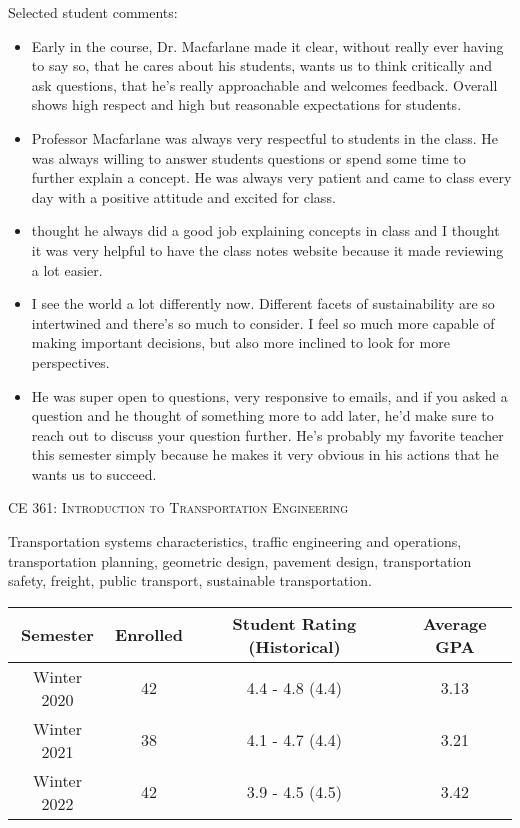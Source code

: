 \documentclass[margin,line]{res}
\newif\ifdetail
\newcommand{\acc}{\scshape }
\begin{document}
\begin{resume}
Selected student comments:
\begin{itemize}
  \item Early in the course, Dr. Macfarlane made it clear, without really ever
    having to say so, that he cares about his students, wants us to think
    critically and ask questions, that he's really approachable and welcomes
    feedback. Overall shows high respect and high but reasonable expectations
    for students.
  \item Professor Macfarlane was always very respectful to students in the class. He
    was always willing to answer students questions or spend some time to
    further explain a concept. He was always very patient and came to class
    every day with a positive attitude and excited for class.
  \item thought he always did a good job explaining concepts in class and I thought it was very helpful to have the class notes website because it made reviewing a lot easier.
  \item I see the world a lot differently now. Different facets of sustainability are so intertwined and there's so much to consider. I feel so much more capable of making important decisions, but also more inclined to look for more perspectives.
  \item He was super open to questions, very responsive to emails, and if you asked a question and he thought of something more to add later, he'd make sure to reach out to discuss your question further. He's probably my favorite teacher this semester simply because he makes it very obvious in his actions that he wants us to succeed.
\end{itemize}


\fi

\vspace{.4cm}
{\acc CE 361: Introduction to Transportation Engineering}

\vspace{-.4cm}
Transportation systems characteristics, traffic engineering and operations,
transportation planning, geometric design, pavement design, transportation
safety, freight, public transport, sustainable transportation.

\ifdetail
\begin{tabular}{cccc}
  \toprule
  Semester & Enrolled & Student Rating (Historical) & Average GPA\\
  \midrule
  Winter 2020 & 42 & 4.4 - 4.8 (4.4) & 3.13 \\
  Winter 2021 & 38 & 4.1 - 4.7 (4.4) & 3.21 \\
  Winter 2022 & 42 & 3.9 - 4.5 (4.5) & 3.42 \\
  \bottomrule


\end{tabular}
\end{resume}
\end{document}
